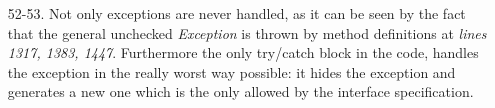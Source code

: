 \begin{itemize}
\item [52-53.] Not only exceptions are never handled, as it can be seen by the fact that the general unchecked \textit{Exception} is thrown by method definitions at  \textit{lines 1317, 1383, 1447}. Furthermore the only try/catch block in the code, handles the exception in the really worst way possible: it hides the exception and generates a new one which is the only allowed by the interface specification.

\end{itemize}